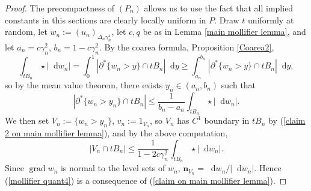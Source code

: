 \documentclass[reqno,10pt]{amsart}
\newcommand*\dif{\mathop{}\!\mathrm{d}}
\DeclareMathOperator{\grad}{grad}
\newcommand{\normal}{\mathbf n}
\theoremstyle{definition}
\numberwithin{equation}{section}
\begin{document}
\begin{proof}
The precompactness of $(P_n)$ allows us to use the fact that all implied constants in this sections are clearly locally uniform in $P$.
Draw $t$ uniformly at random, let $w_n := (u_n)_{\Delta_n \gamma_n^4}$, let $c, q$ be as in Lemma \ref{main mollifier lemma}, and let $a_n = c\gamma_n^2$, $b_n = 1 - c\gamma_n^2$.
By the coarea formula, Proposition \ref{Coarea2},
$$\int_{tB_n} \star |\dif w_n| = \int_0^1 |\partial^* \{w_n > y\} \cap tB_n| \dif y \geq \int_{a_n}^{b_n} |\partial^* \{w_n > y\} \cap tB_n| \dif y,$$
so by the mean value theorem, there exists $y_n \in (a_n, b_n)$ such that
$$|\partial^* \{w_n > y_n\} \cap tB_n| \leq \frac{1}{b_n - a_n} \int_{tB_n} \star |\dif w_n|.$$
We then set $V_n := \{w_n > y_n\}$, $v_n := 1_{V_n}$, so $V_n$ has $C^1$ boundary in $tB_n$ by (\ref{claim 2 on main mollifier lemma}), and by the above computation,
\begin{equation}\label{MVT mollifier}
|V_n \cap tB_n| \leq \frac{1}{1 - 2c\gamma_n^2} \int_{tB_n} \star |\dif w_n|.
\end{equation}
Since $\grad w_n$ is normal to the level sets of $w_n$, $\normal_{V_n} = \dif w_n/|\dif w_n|$.
Hence (\ref{mollifier quant4}) is a consequence of (\ref{claim on main mollifier lemma}).


\end{proof}
\end{document}
